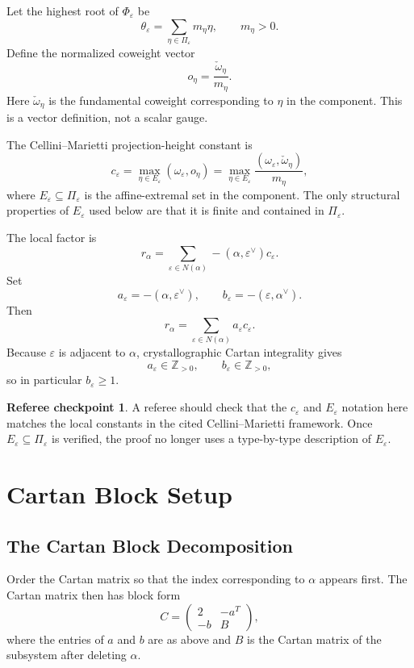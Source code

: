 \documentclass[11pt]{book}
\theoremstyle{definition}
\newtheorem{checkpoint}[theorem]{Referee checkpoint}
\begin{document}
Let the highest root of $\Phi_\varepsilon$ be
\[
 \theta_\varepsilon=\sum_{\eta\in\Pi_\varepsilon}m_\eta\eta,\qquad m_\eta>0.
\]
Define the normalized coweight vector
\[
 \boxed{o_\eta=\frac{\check\omega_\eta}{m_\eta}.}
\]
Here $\check\omega_\eta$ is the fundamental coweight corresponding to $\eta$ in the component. This is a vector definition, not a scalar gauge.

The Cellini--Marietti projection-height constant is
\[
 c_\varepsilon=\max_{\eta\in E_\varepsilon}(\omega_\varepsilon,o_\eta)
 =\max_{\eta\in E_\varepsilon}\frac{(\omega_\varepsilon,\check\omega_\eta)}{m_\eta},
\]
where $E_\varepsilon\subseteq\Pi_\varepsilon$ is the affine-extremal set in the component. The only structural properties of $E_\varepsilon$ used below are that it is finite and contained in $\Pi_\varepsilon$.

The local factor is
\[
 r_\alpha=\sum_{\varepsilon\in N(\alpha)}-(\alpha,\varepsilon^\vee)c_\varepsilon.
\]
Set
\[
 a_\varepsilon=-(\alpha,\varepsilon^\vee),\qquad b_\varepsilon=-(\varepsilon,\alpha^\vee).
\]
Then
\[
 r_\alpha=\sum_{\varepsilon\in N(\alpha)}a_\varepsilon c_\varepsilon.
\]
Because $\varepsilon$ is adjacent to $\alpha$, crystallographic Cartan integrality gives
\[
 a_\varepsilon\in\mathbb Z_{>0},\qquad b_\varepsilon\in\mathbb Z_{>0},
\]
so in particular $b_\varepsilon\ge1$.

\begin{checkpoint}
A referee should check that the $c_\varepsilon$ and $E_\varepsilon$ notation here matches the local constants in the cited Cellini--Marietti framework. Once $E_\varepsilon\subseteq\Pi_\varepsilon$ is verified, the proof no longer uses a type-by-type description of $E_\varepsilon$.
\end{checkpoint}

\part{Cartan Block Setup}

\chapter{The Cartan Block Decomposition}
Order the Cartan matrix so that the index corresponding to $\alpha$ appears first. The Cartan matrix then has block form
\[
 C=\begin{pmatrix}2&-a^T\\ -b&B\end{pmatrix},
\]
where the entries of $a$ and $b$ are as above and $B$ is the Cartan matrix of the subsystem after deleting $\alpha$.
\end{document}
